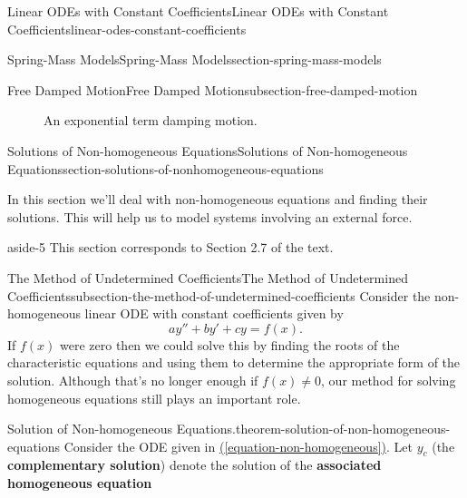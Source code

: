 \documentclass[oneside,10pt,]{book}
\newcommand{\terminology}[1]{\textbf{#1}}
\numberwithin{equation}{section}
\begin{document}
\begin{chapterptx}{Linear ODEs with Constant Coefficients}{}{Linear ODEs with Constant Coefficients}{}{}{linear-odes-constant-coefficients}
\begin{sectionptx}{Spring-Mass Models}{}{Spring-Mass Models}{}{}{section-spring-mass-models}
\begin{subsectionptx}{Free Damped Motion}{}{Free Damped Motion}{}{}{subsection-free-damped-motion}
\begin{figure}
{
}
\caption{An exponential term damping motion.\label{figure-damped-motion}}
\end{figure}
\end{subsectionptx}
\end{sectionptx}
%
%
\typeout{************************************************}
\typeout{************************************************}
%
\begin{sectionptx}{Solutions of Non-homogeneous Equations}{}{Solutions of Non-homogeneous Equations}{}{}{section-solutions-of-nonhomogeneous-equations}
\begin{introduction}{}%
\hypertarget{p-222}{}%
In this section we'll deal with non-homogeneous equations and finding their solutions. This will help us to model systems involving an external force.%
\begin{aside}{}{aside-5}%
\hypertarget{p-223}{}%
This section corresponds to Section 2.7 of the text.%
\end{aside}
\end{introduction}%
%
%
\typeout{************************************************}
\typeout{************************************************}
%
\begin{subsectionptx}{The Method of Undetermined Coefficients}{}{The Method of Undetermined Coefficients}{}{}{subsection-the-method-of-undetermined-coefficients}
\hypertarget{p-224}{}%
Consider the non-homogeneous linear ODE with constant coefficients given by%
\begin{equation}
ay'' + by' + cy = f(x).\label{equation-non-homogeneous}
\end{equation}
If \(f(x)\) were zero then we could solve this by finding the roots of the characteristic equations and using them to determine the appropriate form of the solution. Although that's no longer enough if \(f(x)\neq0\), our method for solving homogeneous equations still plays an important role.%
\begin{theorem}{Solution of Non-homogeneous Equations.}{}{theorem-solution-of-non-homogeneous-equations}%
\hypertarget{p-225}{}%
Consider the ODE given in \hyperref[equation-non-homogeneous]{(\ref{equation-non-homogeneous})}. Let \(y_{c}\) (the \terminology{complementary solution}) denote the solution of the \terminology{associated homogeneous equation}%

\end{theorem}
\end{subsectionptx}
\end{sectionptx}
\end{chapterptx}
\end{document}
